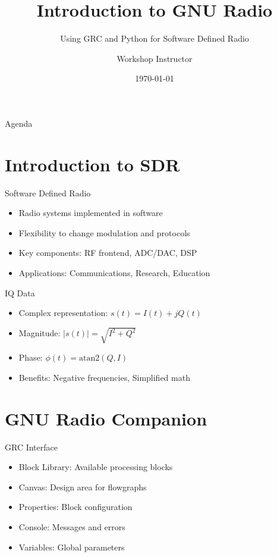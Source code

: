 \documentclass[aspectratio=169,11pt]{beamer}
\title{Introduction to GNU Radio}
\subtitle{Using GRC and Python for Software Defined Radio}
\author{Workshop Instructor}
\institute{GRCon 2025}
\date{\today}
\begin{document}
\begin{frame}
\titlepage
\end{frame}

\begin{frame}{Agenda}
\tableofcontents
\end{frame}

\section{Introduction to SDR}
\begin{frame}{Software Defined Radio}
\begin{itemize}
    \item Radio systems implemented in software
    \item Flexibility to change modulation and protocols
    \item Key components: RF frontend, ADC/DAC, DSP
    \item Applications: Communications, Research, Education
\end{itemize}
\end{frame}

\begin{frame}{IQ Data}
\begin{itemize}
    \item Complex representation: $s(t) = I(t) + jQ(t)$
    \item Magnitude: $|s(t)| = \sqrt{I^2 + Q^2}$
    \item Phase: $\phi(t) = \text{atan2}(Q, I)$
    \item Benefits: Negative frequencies, Simplified math
\end{itemize}
\end{frame}

\section{GNU Radio Companion}
\begin{frame}{GRC Interface}
\begin{itemize}
    \item Block Library: Available processing blocks
    \item Canvas: Design area for flowgraphs
    \item Properties: Block configuration
    \item Console: Messages and errors
    \item Variables: Global parameters
\end{itemize}
\end{frame}
\end{document}
